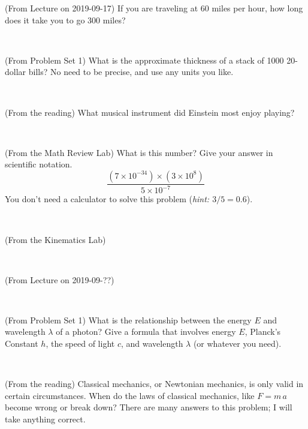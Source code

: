\documentclass[12pt, letterpaper]{article}
\begin{document}
\begin{problem} (From Lecture on 2019-09-17)
If you are traveling at 60 miles per hour, how long does
it take you to go 300 miles?
\end{problem}


\vfill ~

\begin{problem} (From Problem Set 1)
What is the approximate thickness of a stack of 1000 20-dollar bills?
No need to be precise, and use any units you like.
\end{problem}


\vfill ~

\begin{problem} (From the reading)
What musical instrument did Einstein most enjoy playing?
\end{problem}


\vfill ~

\begin{problem} (From the Math Review Lab)
What is this number? Give your answer in scientific notation.
$$
\frac{(7\times10^{-34})\times(3\times10^8)}{5\times10^{-7}}
$$
You don't need a calculator to solve this problem (\textit{hint: $3/5=0.6$}).
\end{problem}


\vfill ~


\clearpage


\begin{problem} (From the Kinematics Lab)

\end{problem}


\vfill ~

\begin{problem} (From Lecture on 2019-09-??)
\end{problem}


\vfill ~

\begin{problem} (From Problem Set 1)
What is the relationship between the energy $E$ and wavelength
$\lambda$ of a photon? Give a formula that involves energy $E$,
Planck's Constant $h$, the speed of light $c$, and wavelength
$\lambda$ (or whatever you need).
\end{problem}

\vfill ~

\begin{problem} (From the reading)
Classical mechanics, or Newtonian mechanics, is only valid in certain
circumstances. When do the laws of classical mechanics, like $F =
m\,a$ become wrong or break down? There are many answers to this
problem; I will take anything correct.
\end{problem}
\end{document}
